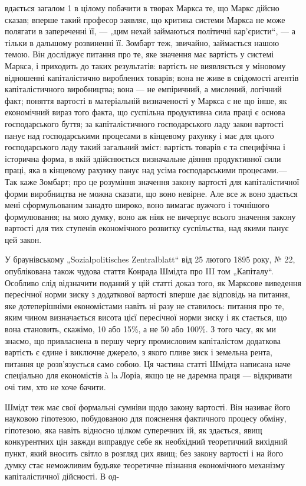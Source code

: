 \parcont{}  %
вдається загалом 1 в цілому побачити в творах Маркса те, що Маркс дійсно сказав; вперше такий професор заявляє, що критика системи Маркса не може полягати в запереченні її, — „цим нехай займаються політичні кар’єристи“, — а тільки в дальшому
розвиненні її. Зомбарт теж, звичайно, займається нашою темою. Він досліджує питання про те, яке значення має вартість у
системі Маркса, і приходить до таких результатів: вартість не виявляється у міновому відношенні капіталістично
вироблених товарів; вона не живе в свідомості агентів капіталістичного виробництва; вона — не емпіричний, а мислений,
логічний факт; поняття вартості в матеріальній визначеності у Маркса є не що інше, як економічний вираз того факта, що
суспільна продуктивна сила праці є основа господарського буття; за капіталістичного господарського ладу закон вартості панує
над господарськими процесами в кінцевому рахунку і має для цього господарського ладу такий загальний зміст: вартість товарів
є та специфічна і історична форма, в якій здійснюється визначальне діяння продуктивної сили праці, яка в кінцевому рахунку
панує над усіма господарськими процесами.— Так каже Зомбарт; про це розуміння значення закону вартості для капіталістичної
форми виробництва не можна сказати, що воно невірне. Але все ж воно здається мені сформульованим занадто широко, воно
вимагає вужчого і точнішого формулювання; на мою думку, воно аж ніяк не вичерпує всього значення закону вартості для тих
ступенів економічного розвитку суспільства, над якими панує цей закон.

У браунівському „Sozialpolitisches Zentralblatt“ від
25 лютого 1895 року, № 22, опублікована також чудова стаття Конрада Шмідта про III том „Капіталу“. Особливо слід відзначити
поданий у цій статті доказ того, як Марксове виведення пересічної норми зиску з додаткової вартості вперше дає відповідь на
питання, яке дотеперішніми економістами навіть ні разу не ставилось:  питання про те, яким чином визначається висота цієї
пересічної норми зиску і як стається, що вона становить, скажімо, 10 або 15\%, а не 50 або 100\%. З того часу, як ми
знаємо, що привласнена в першу чергу промисловим капіталістом додаткова вартість є єдине і виключне джерело, з якого пливе
зиск і земельна рента, питання це розв’язується само собою. Ця частина статті Шмідта написана наче спеціально для
економістів à la Лоріа, якщо це не даремна праця — відкривати очі тим, хто не хоче бачити.

Шмідт теж має свої формальні
сумніви щодо закону вартості. Він називає його науковою гіпотезою, побудованою для пояснення фактичного процесу обміну,
гіпотезою, яка навіть відносно цілком суперечних їй, як здається, явищ конкурентних цін завжди виправдує себе як необхідний
теоретичний вихідний пункт, який вносить світло в розгляд цих явищ; без закону вартості і на його думку стає неможливим
будьяке теоретичне пізнання економічного механізму капіталістичної дійсності. В од-
\parbreak{}  %
